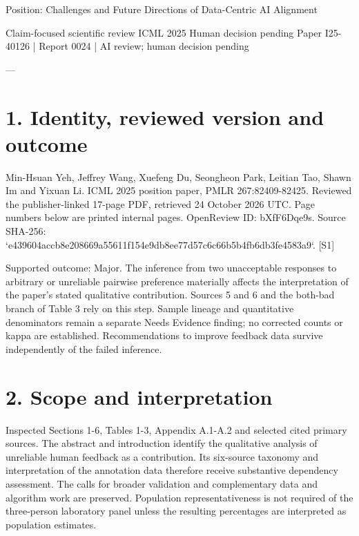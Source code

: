 \documentclass[10pt]{article}
\begin{document}
Position: Challenges and Future Directions of Data-Centric AI Alignment\par
Claim-focused scientific review ICML 2025 Human decision pending
Paper I25-40126 | Report 0024 | AI review; human decision pending\par
---\par
\section*{1. Identity, reviewed version and outcome}
Min-Hsuan Yeh, Jeffrey Wang, Xuefeng Du, Seongheon Park, Leitian Tao, Shawn Im and Yixuan Li. ICML 2025 position paper, PMLR 267:82409-82425. Reviewed the publisher-linked 17-page PDF, retrieved 24 October 2026 UTC. Page numbers below are printed internal pages. OpenReview ID: bXfF6Dqe9s. Source SHA-256: `e439604accb8e208669a55611f154e9db8ee77d57c6c66b5b4fb6db3fe4583a9`. [S1]\par
Supported outcome: Major. The inference from two unacceptable responses to arbitrary or unreliable pairwise preference materially affects the interpretation of the paper’s stated qualitative contribution. Sources 5 and 6 and the both-bad branch of Table 3 rely on this step. Sample lineage and quantitative denominators remain a separate Needs Evidence finding; no corrected counts or kappa are established. Recommendations to improve feedback data survive independently of the failed inference.\par
\section*{2. Scope and interpretation}
Inspected Sections 1-6, Tables 1-3, Appendix A.1-A.2 and selected cited primary sources. The abstract and introduction identify the qualitative analysis of unreliable human feedback as a contribution. Its six-source taxonomy and interpretation of the annotation data therefore receive substantive dependency assessment. The calls for broader validation and complementary data and algorithm work are preserved. Population representativeness is not required of the three-person laboratory panel unless the resulting percentages are interpreted as population estimates.\par
\end{document}

